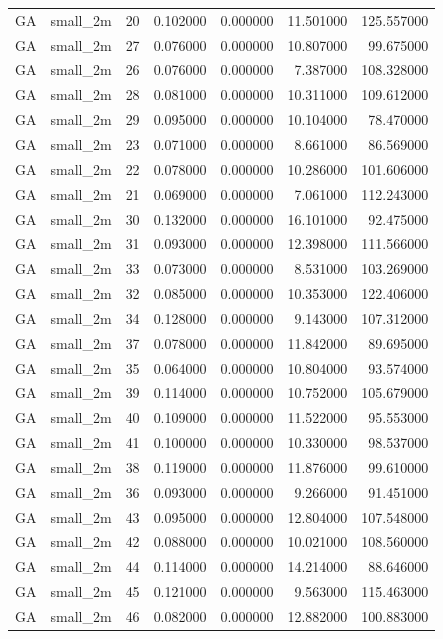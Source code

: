 \begin{tabular}{llrrrrr}
GA & small_2m & 20 & 0.102000 & 0.000000 & 11.501000 & 125.557000 \\
GA & small_2m & 27 & 0.076000 & 0.000000 & 10.807000 & 99.675000 \\
GA & small_2m & 26 & 0.076000 & 0.000000 & 7.387000 & 108.328000 \\
GA & small_2m & 28 & 0.081000 & 0.000000 & 10.311000 & 109.612000 \\
GA & small_2m & 29 & 0.095000 & 0.000000 & 10.104000 & 78.470000 \\
GA & small_2m & 23 & 0.071000 & 0.000000 & 8.661000 & 86.569000 \\
GA & small_2m & 22 & 0.078000 & 0.000000 & 10.286000 & 101.606000 \\
GA & small_2m & 21 & 0.069000 & 0.000000 & 7.061000 & 112.243000 \\
GA & small_2m & 30 & 0.132000 & 0.000000 & 16.101000 & 92.475000 \\
GA & small_2m & 31 & 0.093000 & 0.000000 & 12.398000 & 111.566000 \\
GA & small_2m & 33 & 0.073000 & 0.000000 & 8.531000 & 103.269000 \\
GA & small_2m & 32 & 0.085000 & 0.000000 & 10.353000 & 122.406000 \\
GA & small_2m & 34 & 0.128000 & 0.000000 & 9.143000 & 107.312000 \\
GA & small_2m & 37 & 0.078000 & 0.000000 & 11.842000 & 89.695000 \\
GA & small_2m & 35 & 0.064000 & 0.000000 & 10.804000 & 93.574000 \\
GA & small_2m & 39 & 0.114000 & 0.000000 & 10.752000 & 105.679000 \\
GA & small_2m & 40 & 0.109000 & 0.000000 & 11.522000 & 95.553000 \\
GA & small_2m & 41 & 0.100000 & 0.000000 & 10.330000 & 98.537000 \\
GA & small_2m & 38 & 0.119000 & 0.000000 & 11.876000 & 99.610000 \\
GA & small_2m & 36 & 0.093000 & 0.000000 & 9.266000 & 91.451000 \\
GA & small_2m & 43 & 0.095000 & 0.000000 & 12.804000 & 107.548000 \\
GA & small_2m & 42 & 0.088000 & 0.000000 & 10.021000 & 108.560000 \\
GA & small_2m & 44 & 0.114000 & 0.000000 & 14.214000 & 88.646000 \\
GA & small_2m & 45 & 0.121000 & 0.000000 & 9.563000 & 115.463000 \\
GA & small_2m & 46 & 0.082000 & 0.000000 & 12.882000 & 100.883000 \\

\end{tabular}
